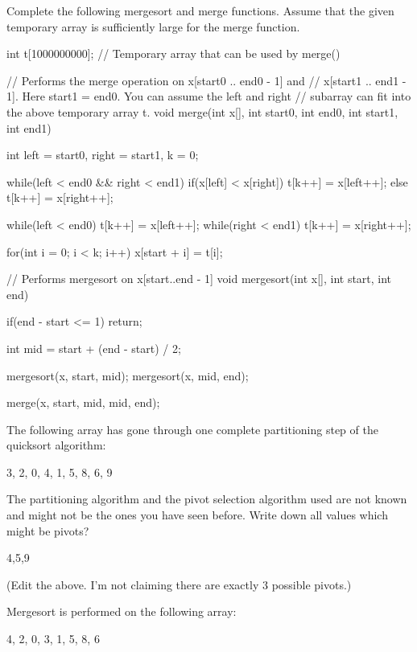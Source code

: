 \newpage
\nextq
Complete the following mergesort and merge functions.
Assume that the given temporary array is sufficiently large for
the merge function.

\ANSWER
\begin{answercode}
int t[1000000000]; // Temporary array that can be used by merge()

// Performs the merge operation on x[start0 .. end0 - 1] and
// x[start1 .. end1 - 1]. Here start1 = end0. You can assume the left and right
// subarray can fit into the above temporary array t.
void merge(int x[], int start0, int end0, int start1, int end1)
{
  int left = start0, right = start1, k = 0;

  while(left < end0 && right < end1)
  {
    if(x[left] < x[right])
      t[k++] = x[left++];
    else
      t[k++] = x[right++];
  }

  while(left < end0)
     t[k++] = x[left++];
  while(right < end1)
     t[k++] = x[right++];

  for(int i = 0; i < k; i++)
  {
    x[start + i] = t[i];
  }
}

// Performs mergesort on x[start..end - 1]
void mergesort(int x[], int start, int end)
{
  if(end - start <= 1)
    return;

  int mid = start + (end - start) / 2;

  mergesort(x, start, mid);
  mergesort(x, mid, end);

  merge(x, start, mid, mid, end);
}
\end{answercode}

\newpage
\nextq %
The following array has gone through one complete
partitioning step of the quicksort algorithm:
\begin{console}
{3, 2, 0, 4, 1, 5, 8, 6, 9}
\end{console}
The partitioning algorithm and the pivot selection algorithm
used are not known and might not be the ones you have seen before.
Write down all values which might be pivots?
\\
\ANSWER
\begin{answercode}
4,5,9
\end{answercode}
(Edit the above. I'm not claiming there are exactly 3 possible pivots.)

\newpage
\nextq
Mergesort is performed on the following
array:
\begin{console}
{4, 2, 0, 3, 1, 5, 8, 6}
\end{console}

